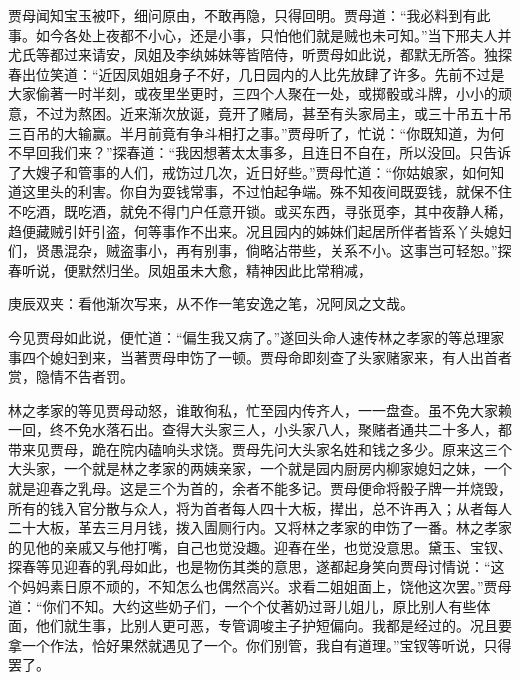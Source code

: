 \begin{parag}
    贾母闻知宝玉被吓，细问原由，不敢再隐，只得回明。贾母道：“我必料到有此事。如今各处上夜都不小心，还是小事，只怕他们就是贼也未可知。”当下邢夫人并尤氏等都过来请安，凤姐及李纨姊妹等皆陪侍，听贾母如此说，都默无所答。独探春出位笑道：“近因凤姐姐身子不好，几日园内的人比先放肆了许多。先前不过是大家偷著一时半刻，或夜里坐更时，三四个人聚在一处，或掷骰或斗牌，小小的顽意，不过为熬困。近来渐次放诞，竟开了赌局，甚至有头家局主，或三十吊五十吊三百吊的大输赢。半月前竟有争斗相打之事。”贾母听了，忙说：“你既知道，为何不早回我们来？”探春道：“我因想著太太事多，且连日不自在，所以没回。只告诉了大嫂子和管事的人们，戒饬过几次，近日好些。”贾母忙道：“你姑娘家，如何知道这里头的利害。你自为耍钱常事，不过怕起争端。殊不知夜间既耍钱，就保不住不吃酒，既吃酒，就免不得门户任意开锁。或买东西，寻张觅李，其中夜静人稀，趋便藏贼引奸引盗，何等事作不出来。况且园内的姊妹们起居所伴者皆系丫头媳妇们，贤愚混杂，贼盗事小，再有别事，倘略沾带些，关系不小。这事岂可轻恕。”探春听说，便默然归坐。凤姐虽未大愈，精神因此比常稍减，\begin{note}庚辰双夹：看他渐次写来，从不作一笔安逸之笔，况阿凤之文哉。\end{note}今见贾母如此说，便忙道：“偏生我又病了。”遂回头命人速传林之孝家的等总理家事四个媳妇到来，当著贾母申饬了一顿。贾母命即刻查了头家赌家来，有人出首者赏，隐情不告者罚。
\end{parag}


\begin{parag}
    林之孝家的等见贾母动怒，谁敢徇私，忙至园内传齐人，一一盘查。虽不免大家赖一回，终不免水落石出。查得大头家三人，小头家八人，聚赌者通共二十多人，都带来见贾母，跪在院内磕响头求饶。贾母先问大头家名姓和钱之多少。原来这三个大头家，一个就是林之孝家的两姨亲家，一个就是园内厨房内柳家媳妇之妹，一个就是迎春之乳母。这是三个为首的，余者不能多记。贾母便命将骰子牌一并烧毁，所有的钱入官分散与众人，将为首者每人四十大板，撵出，总不许再入；从者每人二十大板，革去三月月钱，拨入圊厕行内。又将林之孝家的申饬了一番。林之孝家的见他的亲戚又与他打嘴，自己也觉没趣。迎春在坐，也觉没意思。黛玉、宝钗、探春等见迎春的乳母如此，也是物伤其类的意思，遂都起身笑向贾母讨情说：“这个妈妈素日原不顽的，不知怎么也偶然高兴。求看二姐姐面上，饶他这次罢。”贾母道：“你们不知。大约这些奶子们，一个个仗著奶过哥儿姐儿，原比别人有些体面，他们就生事，比别人更可恶，专管调唆主子护短偏向。我都是经过的。况且要拿一个作法，恰好果然就遇见了一个。你们别管，我自有道理。”宝钗等听说，只得罢了。
\end{parag}


